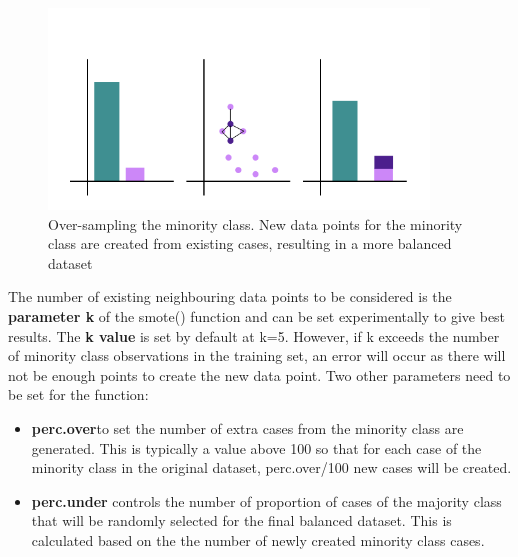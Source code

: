 \begin{figure}[!htbp]
    \centering
    \includegraphics[width=0.9\textwidth]{ThesisTemplate/usingLatex/chapter4Images/Figure2002.png}
    \caption{Over-sampling the minority class. New data points for the minority class are created from existing cases, resulting in a more balanced dataset}
    \label{fig:OverSample}
\end{figure}


The number of existing neighbouring data points to be considered is the \textbf{parameter k} of the smote() function and can be set experimentally to give best results.\newline
The \textbf{k value} is set by default at k=5. However, if k exceeds the number of minority class observations in the training set, an error will occur as there will not be enough points to create the new data point.\newline
Two other parameters need to be set for the function: 
\begin{itemize}
    \item \textbf{perc.over}to set the number of extra cases from the minority class are generated. This is typically a value above 100 so that for each case of the minority class in the original dataset, perc.over/100 new cases will be created.
    \item \textbf{perc.under} controls the number of proportion of cases of the majority class that will be randomly selected for the final balanced dataset. This is calculated based on the the number of newly created minority class cases. 
\end{itemize}

